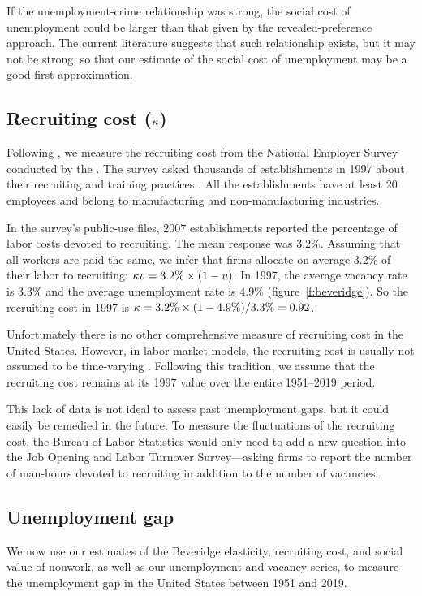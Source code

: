 \documentclass[letterpaper,12pt,leqno]{article}
\begin{document}
If the unemployment-crime relationship was strong, the social cost of unemployment could be larger than that given by the revealed-preference approach. The current literature suggests that such relationship exists, but it may not be strong, so that our estimate of the social cost of unemployment may be a good first approximation.

\subsection{Recruiting cost ($\kappa$)}

Following , we measure the recruiting cost from the National Employer Survey conducted by the . The survey asked thousands of establishments in 1997 about their recruiting and training practices . All the establishments have at least 20 employees and belong to manufacturing and non-manufacturing industries.

In the survey's public-use files, $2007$ establishments reported the percentage of labor costs devoted to recruiting. The mean response was $3.2\%$. Assuming that all workers are paid the same, we infer that firms allocate on average $3.2\%$ of their labor to recruiting: $\kappa v = 3.2\% \times (1-u)$. In 1997, the average vacancy rate is $3.3\%$ and the average unemployment rate is $4.9\%$ (figure~\ref{f:beveridge}). So the recruiting cost in 1997 is $\kappa =  3.2\% \times (1-4.9\%) / 3.3\% = 0.92$.

Unfortunately there is no other comprehensive measure of recruiting cost in the United States. However, in labor-market models, the recruiting cost is usually not assumed to be time-varying . Following this tradition, we assume that the recruiting cost remains at its 1997 value over the entire 1951--2019 period. 

This lack of data is not ideal to assess past unemployment gaps, but it could easily be remedied in the future. To measure the fluctuations of the recruiting cost, the Bureau of Labor Statistics would only need to add a new question into the Job Opening and Labor Turnover Survey---asking firms to report the number of man-hours devoted to recruiting in addition to the number of vacancies.

\subsection{Unemployment gap}

We now use our estimates of the Beveridge elasticity, recruiting cost, and social value of nonwork, as well as our unemployment and vacancy series, to measure the unemployment gap in the United States between 1951 and 2019.
\end{document}
